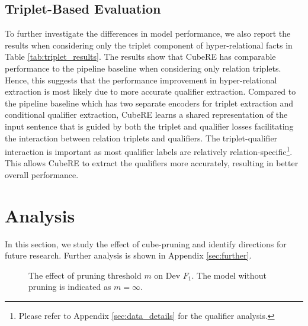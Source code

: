 \documentclass[11pt]{article}
\newcommand{\modelname}{CubeRE}
\begin{document}
\subsection{Triplet-Based Evaluation}
{
To further investigate the differences in model performance, we also report the results when considering only the triplet component of hyper-relational facts in Table \ref{tab:triplet_results}.
The results show that \modelname{} has comparable performance to the pipeline baseline when considering only relation triplets.
Hence, this suggests that the performance improvement in hyper-relational extraction is most likely due to more accurate qualifier extraction. 
Compared to the pipeline baseline which has two separate encoders for triplet extraction and conditional qualifier extraction, \modelname{} learns a shared representation of the input sentence that is guided by both the triplet and qualifier losses facilitating the interaction between relation triplets and qualifiers.
The triplet-qualifier interaction is important as most qualifier labels are relatively relation-specific\footnote{Please refer to Appendix \ref{sec:data_details} for the qualifier analysis.}.
This allows \modelname{} to extract the qualifiers more accurately, resulting in better overall performance.
}

\section{Analysis}
\label{sec:analysis}
In this section, we study the effect of cube-pruning and identify directions for future research. Further analysis is shown in Appendix \ref{sec:further}.

\begin{figure}
\centering
{}
\vspace{-3mm}
\caption{The effect of pruning threshold $m$ on Dev $F_1$. The model without pruning is indicated as $m=\infty$.\vspace{-5mm}}
\label{fig:prune}
\end{figure}
\end{document}
